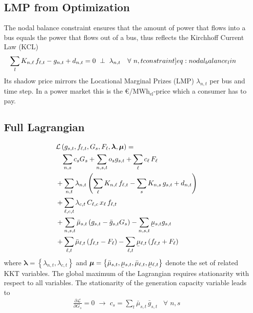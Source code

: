 \documentclass[11pt,twocolumn]{article}
\newcommand{\ubar}[1]{\underaccent{\bar}{#1}}
\newcommand{\resultsin}[1]{\hspace{6pt} \bot  \hspace{6pt} #1}
\newcommand{\Forall}[1]{\hspace{10pt} \forall \,\, #1 }
\newcommand{\pdv}[2]{\frac{\partial #1}{\partial #2}}
\newcommand{\generation}{g_{s,t}}
\newcommand{\generationpotential}{\bar{g}_{s,t}}
\newcommand{\nodalgeneration}[1][n]{g_{#1,t}}
\newcommand{\capacitygeneration}{G_{s}}
\newcommand{\capacityflow}{F_{\ell}}
\newcommand{\capitalpricegeneration}{c_{s}}
\newcommand{\capitalpriceflow}{c_{\ell}}
\newcommand{\operationalpricegeneration}{o_{s}}
\newcommand{\demand}[1][n]{d_{#1,t}}
\newcommand{\nodaldemand}[1][n]{d_{#1,t}}
\newcommand{\incidence}[1][n]{K_{#1,\ell}}
\newcommand{\incidencegenerator}[1][n]{K_{#1,s}}
\newcommand{\mulowergeneration}{\ubar{\mu}_{s,t}}
\newcommand{\muuppergeneration}{\bar{\mu}_{s,t}}
\newcommand{\mulowerflow}{\ubar{\mu}_{\ell,t}}
\newcommand{\muupperflow}{\bar{\mu}_{\ell,t}}
\newcommand{\lmp}[1][n]{\lambda_{#1,t}}
\newcommand{\flow}{f_{\ell,t}}
\newcommand{\cycle}{C_{\ell,c}}
\newcommand{\impedance}{x_\ell}
\newcommand{\cycleprice}{\lambda_{c,t}}
\newcommand{\lagrangian}{\mathcal{L}}
\newcommand{\megawatthour}{MWh$_\text{el}$}
\begin{document}
\renewcommand\theequation{\thesection.\arabic{equation}}
\setcounter{equation}{0}

\renewcommand\thefigure{\thesection.\arabic{figure}}    
\setcounter{figure}{0}    

\subsection{LMP from Optimization}
The nodal balance constraint ensures that the amount of power that flows into a bus equals the power that flows out of a bus, thus reflects the Kirchhoff Current Law (KCL)
\begin{align}
    \sum_l \incidence \, \flow  - \nodalgeneration + \nodaldemand &= 0 \resultsin{\lmp} \Forall{n,t}
    \label[constraint]{eq:nodal_balance_lin}
\end{align}
Its shadow price mirrors the Locational Marginal Prizes (LMP) $\lmp$ per bus and time step. In a power market this is the \euro/\megawatthour-price which a consumer has to pay.\\

\subsection{Full Lagrangian}
\label{sec:full_lagrangian}
\begin{align}
\notag
& \lagrangian\left(\generation, \flow, \capacitygeneration, \capacityflow, \boldsymbol{\lambda}, \boldsymbol{\mu} \right)   =   \\  
\notag
& \;\;\; \sum_{n,s} \capitalpricegeneration \capacitygeneration + \sum_{n, s, t} \operationalpricegeneration \generation + \sum_{\ell} \capitalpriceflow \, \capacityflow  \\
\notag
&+ \sum_{n,t} \lmp \left(\sum_\ell \incidence \, \flow  - \sum_s \incidencegenerator\, \generation +  \demand  \right)  \\ 
\notag
&+ \sum_{\ell,c,t} \cycleprice \, \cycle \, \impedance \, \flow  \\
\notag
&+ \sum_{n,s,t} \muuppergeneration \left( \generation - \generationpotential \capacitygeneration \right)  - \sum_{n,s,t} \mulowergeneration \generation  \\
&+ \sum_{\ell,t} \muupperflow \left( \flow - \capacityflow \right) - \sum_{\ell,t} \mulowerflow \left( \flow + \capacityflow \right)     
\label{eq:full_lagrangian}
\end{align}
% 
where $\boldsymbol{\lambda} = \left\lbrace \lmp, \cycleprice \right\rbrace $ and $\boldsymbol{\mu} = \left\lbrace \muuppergeneration, \mulowergeneration, \muupperflow, \mulowerflow \right\rbrace $ denote the set of related KKT variables. The global maximum of the Lagrangian requires stationarity with respect to all variables. The stationarity of the generation capacity variable leads to 
\begin{align}
\pdv{\lagrangian}{\capacitygeneration}  = 0 \,\, \rightarrow \,\, 
\capitalpricegeneration =  \sum_t \muuppergeneration \, \generationpotential  \Forall{n,s}
\label{eq:capex_generation_duality}
\end{align}
\end{document}

